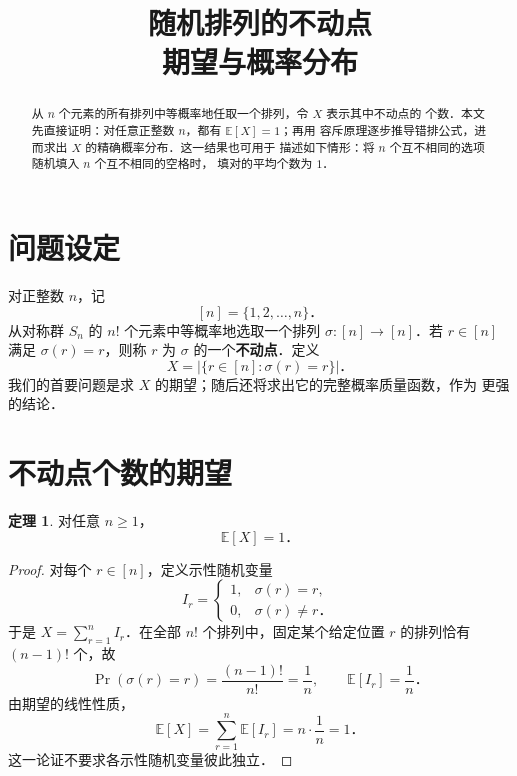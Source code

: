 \documentclass[UTF8,11pt,a4paper,fontset=none]{ctexart}
\title{\textbf{随机排列的不动点}\\
  \large 期望与概率分布}
\author{}
\date{}
\theoremstyle{definition}
\newtheorem{theorem}{定理}
\begin{document}
\newcommand{\EditionName}{中文修订版}
\newcommand{\EditionSummary}{%
  本版以修订英文本为基础，用规范的中文重新撰写，并采用相同的定义、结论与证明．}


\maketitle
\vspace{-2em}

\begin{abstract}
从 \(n\) 个元素的所有排列中等概率地任取一个排列，令 \(X\) 表示其中不动点的
个数．本文先直接证明：对任意正整数 \(n\)，都有 \(\mathbb{E}[X]=1\)；再用
容斥原理逐步推导错排公式，进而求出 \(X\) 的精确概率分布．这一结果也可用于
描述如下情形：将 \(n\) 个互不相同的选项随机填入 \(n\) 个互不相同的空格时，
填对的平均个数为 \(1\)．
\end{abstract}

\section{问题设定}

对正整数 \(n\)，记
\[
  [n]=\{1,2,\ldots,n\}\text{．}
\]
从对称群 \(S_n\) 的 \(n!\) 个元素中等概率地选取一个排列
\(\sigma:[n]\to[n]\)．若 \(r\in[n]\) 满足 \(\sigma(r)=r\)，则称 \(r\) 为
\(\sigma\) 的一个\textbf{不动点}．定义
\[
  X=\bigl|\{r\in[n]:\sigma(r)=r\}\bigr|\text{．}
\]
我们的首要问题是求 \(X\) 的期望；随后还将求出它的完整概率质量函数，作为
更强的结论．

\section{不动点个数的期望}

\begin{theorem}
对任意 \(n\geq 1\)，
\[
  \mathbb{E}[X]=1\text{．}
\]
\end{theorem}

\begin{proof}
对每个 \(r\in[n]\)，定义示性随机变量
\[
  I_r=
  \begin{cases}
    1, & \sigma(r)=r,\\
    0, & \sigma(r)\ne r\text{．}
  \end{cases}
\]
于是 \(X=\sum_{r=1}^{n}I_r\)．在全部 \(n!\) 个排列中，固定某个给定位置
\(r\) 的排列恰有 \((n-1)!\) 个，故
\[
  \Pr(\sigma(r)=r)=\frac{(n-1)!}{n!}=\frac{1}{n},
  \qquad
  \mathbb{E}[I_r]=\frac{1}{n}\text{．}
\]
由期望的线性性质，
\[
  \mathbb{E}[X]
    =\sum_{r=1}^{n}\mathbb{E}[I_r]
    =n\cdot\frac{1}{n}
    =1\text{．}
\]
这一论证不要求各示性随机变量彼此独立．
\end{proof}
\end{document}
